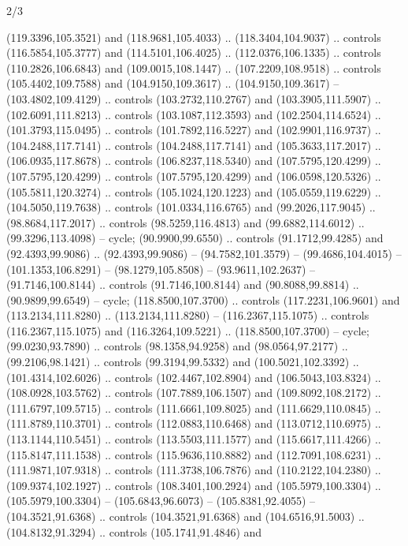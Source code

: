 \begin{flagdescription}{2/3}
\begin{scope}[scale=0.00214\flagwidth,yshift=164.5mm]
\begin{scope}[y=-0.8pt, x=0.8pt, inner sep=0pt, outer sep=0pt]
\begin{scope}[draw=black,fill=dark,line width=0.162pt]
  (119.3396,105.3521) and (118.9681,105.4033) .. (118.3404,104.9037) .. controls
  (116.5854,105.3777) and (114.5101,106.4025) .. (112.0376,106.1335) .. controls
  (110.2826,106.6843) and (109.0015,108.1447) .. (107.2209,108.9518) .. controls
  (105.4402,109.7588) and (104.9150,109.3617) .. (104.9150,109.3617) --
  (103.4802,109.4129) .. controls (103.2732,110.2767) and (103.3905,111.5907) ..
  (102.6091,111.8213) .. controls (103.1087,112.3593) and (102.2504,114.6524) ..
  (101.3793,115.0495) .. controls (101.7892,116.5227) and (102.9901,116.9737) ..
  (104.2488,117.7141) .. controls (104.2488,117.7141) and (105.3633,117.2017) ..
  (106.0935,117.8678) .. controls (106.8237,118.5340) and (107.5795,120.4299) ..
  (107.5795,120.4299) .. controls (107.5795,120.4299) and (106.0598,120.5326) ..
  (105.5811,120.3274) .. controls (105.1024,120.1223) and (105.0559,119.6229) ..
  (104.5050,119.7638) .. controls (101.0334,116.6765) and (99.2026,117.9045) ..
  (98.8684,117.2017) .. controls (98.5259,116.4813) and (99.6882,114.6012) ..
  (99.3296,113.4098) -- cycle;
 (90.9900,99.6550) .. controls (91.1712,99.4285) and
  (92.4393,99.9086) .. (92.4393,99.9086) -- (94.7582,101.3579) --
  (99.4686,104.4015) -- (101.1353,106.8291) -- (98.1279,105.8508) --
  (93.9611,102.2637) -- (91.7146,100.8144) .. controls (91.7146,100.8144) and
  (90.8088,99.8814) .. (90.9899,99.6549) -- cycle;
 (118.8500,107.3700) .. controls (117.2231,106.9601) and
  (113.2134,111.8280) .. (113.2134,111.8280) -- (116.2367,115.1075) .. controls
  (116.2367,115.1075) and (116.3264,109.5221) .. (118.8500,107.3700) -- cycle;
 (99.0230,93.7890) .. controls (98.1358,94.9258) and
  (98.0564,97.2177) .. (99.2106,98.1421) .. controls (99.3194,99.5332) and
  (100.5021,102.3392) .. (101.4314,102.6026) .. controls (102.4467,102.8904) and
  (106.5043,103.8324) .. (108.0928,103.5762) .. controls (107.7889,106.1507) and
  (109.8092,108.2172) .. (111.6797,109.5715) .. controls (111.6661,109.8025) and
  (111.6629,110.0845) .. (111.8789,110.3701) .. controls (112.0883,110.6468) and
  (113.0712,110.6975) .. (113.1144,110.5451) .. controls (113.5503,111.1577) and
  (115.6617,111.4266) .. (115.8147,111.1538) .. controls (115.9636,110.8882) and
  (112.7091,108.6231) .. (111.9871,107.9318) .. controls (111.3738,106.7876) and
  (110.2122,104.2380) .. (109.9374,102.1927) .. controls (108.3401,100.2924) and
  (105.5979,100.3304) .. (105.5979,100.3304) -- (105.6843,96.6073) --
  (105.8381,92.4055) -- (104.3521,91.6368) .. controls (104.3521,91.6368) and
  (104.6516,91.5003) .. (104.8132,91.3294) .. controls (105.1741,91.4846) and

\end{scope}
\end{scope}
\end{scope}
\end{flagdescription}
